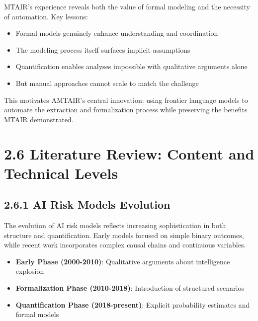 \documentclass[
  11pt,
  letterpaper,
]{book}
\providecommand{\tightlist}{%
  \setlength{\itemsep}{0pt}\setlength{\parskip}{0pt}}
\begin{document}
MTAIR's experience reveals both the value of formal modeling and the
necessity of automation. Key lessons:

\begin{itemize}
\tightlist
\item
  Formal models genuinely enhance understanding and coordination
\item
  The modeling process itself surfaces implicit assumptions
\item
  Quantification enables analyses impossible with qualitative arguments
  alone
\item
  But manual approaches cannot scale to match the challenge
\end{itemize}

This motivates AMTAIR's central innovation: using frontier language
models to automate the extraction and formalization process while
preserving the benefits MTAIR demonstrated.

\section*{2.6 Literature Review: Content and Technical
Levels}\label{sec-literature-review}


\subsection*{2.6.1 AI Risk Models
Evolution}\label{sec-risk-models-evolution}

The evolution of AI risk models reflects increasing sophistication in
both structure and quantification. Early models focused on simple binary
outcomes, while recent work incorporates complex causal chains and
continuous variables.

\begin{tcolorbox}[enhanced jigsaw, opacityback=0, leftrule=.75mm, breakable, coltitle=black, colbacktitle=quarto-callout-note-color!10!white, bottomrule=.15mm, rightrule=.15mm, toprule=.15mm, left=2mm, bottomtitle=1mm, arc=.35mm, toptitle=1mm, titlerule=0mm, title=\textcolor{quarto-callout-note-color}{\faInfo}\hspace{0.5em}{Key Developments}, opacitybacktitle=0.6, colframe=quarto-callout-note-color-frame, colback=white]

\begin{itemize}
\tightlist
\item
  \textbf{Early Phase (2000-2010)}: Qualitative arguments about
  intelligence explosion
\item
  \textbf{Formalization Phase (2010-2018)}: Introduction of structured
  scenarios
\item
  \textbf{Quantification Phase (2018-present)}: Explicit probability
  estimates and formal models
\end{itemize}

\end{tcolorbox}
\end{document}
